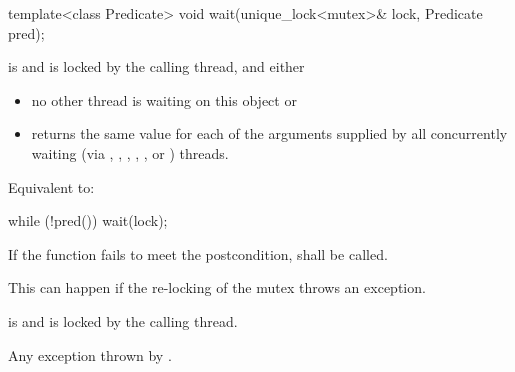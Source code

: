 %
\begin{itemdecl}
template<class Predicate>
  void wait(unique_lock<mutex>& lock, Predicate pred);
\end{itemdecl}
\begin{itemdescr}
 \pnum \requires {} is  and  is
        locked by the calling thread, and either

        \begin{itemize}
         \item no other thread is waiting on this  object or
         \item {} returns the same value for each of the 
                arguments supplied by all concurrently waiting (via ,
                , 
                {\color{insertcolor}, , , or }) threads.
        \end{itemize}

 \pnum \effects Equivalent to:
\begin{codeblock}
while (!pred())
  wait(lock);
\end{codeblock}

 \pnum \remarks
        If the function fails to meet the postcondition, 
        shall be called.
        \begin{note} This can happen if the re-locking of the mutex throws an exception. \end{note}

 \pnum \postconditions {} is  and 
        is locked by the calling thread.

 \pnum \throws Any exception thrown by .
\end{itemdescr}


